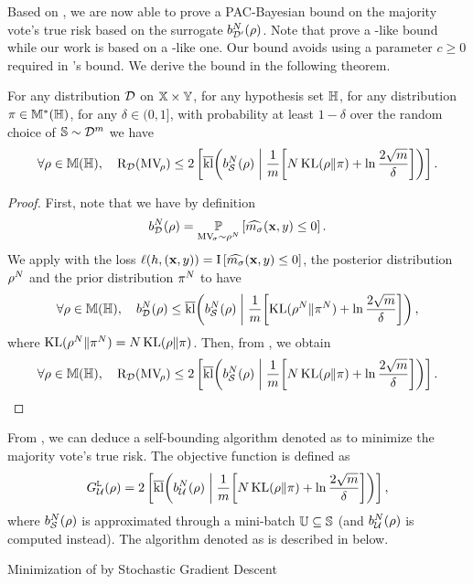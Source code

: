 \begin{noaddcontents}
Based on , we are now able to prove a PAC-Bayesian bound on the majority vote's true risk based on the surrogate $b_{\Dp}^{N}(\Q)$.
Note that \citet{LacasseLavioletteMarchandTurgeonBoutin2010} prove a \citeauthor{Catoni2007}-like bound while our work is based on a \citeauthor{Seeger2002}-like one.
Our bound avoids using a parameter $c\ge 0$ required in \citeauthor{Catoni2007}'s bound.
We derive the bound in the following theorem.

\begin{theorem} For any distribution $\D$ on $\X\times\Y$, for any hypothesis set $\H$, for any distribution $\P\in\M^{*}(\H)$, for any $\delta\in(0,1]$, with probability at least $1-\delta$ over the random choice of $\S\sim\D^\m$ we have 
\begin{align}
\forall\Q\in\M(\H),\quad \Risk_{\D}(\MVQ) \le 2\LB \klmax\!\LP b_{\dS}^{N}(\Q) \;\middle|\; \frac{1}{\m}\!\LB N\KL(\Q\|\P)+\ln\frac{2\sqrt{\m}}{\delta}\RB\RP \RB.\label{ap:mv-sto:eq:lacasse}
\end{align}
\label{ap:mv-sto:theorem:lacasse}
\end{theorem}
\begin{proof}
First, note that we have by definition
\begin{align*}
    b_{\D}^{N}(\Q) = \PP_{\MVQrand\sim\Q^N}\LB \OmMaQrand(\x,\y)\le 0\RB.
\end{align*}
We apply  with the loss $\loss(\h, (\x,\y)) = \indic\LB \OmMaQrand(\x,\y) \le 0 \RB$, the posterior distribution $\Q^N$ and the prior distribution $\P^N$ to have
\begin{align*}
    \forall\Q\in\M(\H),\quad b_{\D}^{N}(\Q) \le \klmax\!\LP b_{\dS}^{N}(\Q) \;\middle|\; \frac{1}{\m}\!\LB\KL(\Q^N\|\P^N)+\ln\frac{2\sqrt{\m}}{\delta}\RB\RP,
\end{align*}
where $\KL(\Q^N\|\P^N)=N\KL(\Q\|\P)$.
Then, from , we obtain 
\begin{align*}
\forall\Q\in\M(\H),\quad \Risk_{\D}(\MVQ) \le 2\LB \klmax\!\LP b_{\dS}^{N}(\Q) \;\middle|\; \frac{1}{\m}\!\LB N\KL(\Q\|\P)+\ln\frac{2\sqrt{\m}}{\delta}\RB\RP \RB.
\end{align*}
\end{proof}

From , we can deduce a self-bounding algorithm denoted as \algolacasse to minimize the majority vote's true risk.
The objective function is defined as 
\begin{align*}
\LaObjbatch = 2\LB \klmax\!\LP b_{\dbatch}^{N}(\Q) \;\middle|\; \frac{1}{\m}\!\LB N\KL(\Q\|\P)+\ln\frac{2\sqrt{\m}}{\delta}\RB\RP \RB,
\end{align*}
where $b_{\dS}^{N}(\Q)$ is approximated through a mini-batch $\batch\subseteq\S$ (and $b_{\dbatch}^{N}(\Q)$ is computed instead).
The algorithm denoted as \algolacasse is described in  below.
\begin{algorithm}[h!]
 \caption{Minimization of  by Stochastic Gradient Descent}
  \begin{algorithmic}
  

\end{algorithmic}
\end{algorithm}
\end{noaddcontents}

